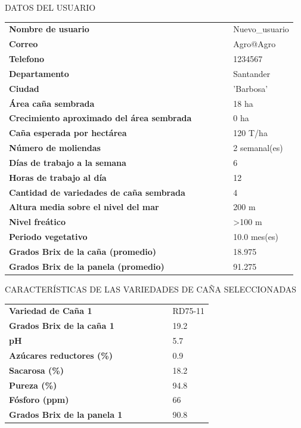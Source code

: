 \documentclass{article}%
\begin{document}
\newpage%
\begin{center}%
\begin{Huge}%
DATOS DEL USUARIO%
\end{Huge}%
\linebreak%
\end{center}%
\begin{tabular}{lccccl}%
\textbf{Nombre de usuario}& & & & &Nuevo\_usuario\\%
\textbf{Correo}& & & & &Agro@Agro\\%
\textbf{Telefono}& & & & &1234567\\%
\textbf{Departamento}& & & & &Santander\\%
\textbf{Ciudad}& & & & & 'Barbosa'\\%
\textbf{Área caña sembrada}& & & & &18 ha\\%
\textbf{Crecimiento aproximado del área sembrada}& & & & &0 ha\\%
\textbf{Caña esperada por hectárea}& & & & &120 T/ha\\%
\textbf{Número de moliendas}& & & & &2 semanal(es)\\%
\textbf{Días de trabajo a la semana}& & & & &6\\%
\textbf{Horas de trabajo al día}& & & & &12\\%
\textbf{Cantidad de variedades de caña sembrada}& & & & &4\\%
\textbf{Altura media sobre el nivel del mar}& & & & &200 m\\%
\textbf{Nivel freático}& & & & &>100 m\\%
\textbf{Periodo vegetativo}& & & & &10.0 mes(es)\\%
\textbf{Grados Brix de la caña (promedio)}& & & & &18.975\\%
\textbf{Grados Brix de la panela (promedio)}& & & & &91.275\\%
\end{tabular}%
\newpage%
\begin{center}%
\begin{Huge}%
CARACTERÍSTICAS DE LAS VARIEDADES DE CAÑA SELECCIONADAS%
\end{Huge}%
\linebreak%
\end{center}%
\begin{tabular}{lcccccl}%
\textbf{Variedad de Caña 1}& & & & & &RD75{-}11\\%
\textbf{Grados Brix de la caña 1}& & & & & &19.2\\%
\textbf{pH}& & & & & &5.7\\%
\textbf{Azúcares reductores (\%)}& & & & & &0.9\\%
\textbf{Sacarosa (\%)}& & & & & &18.2\\%
\textbf{Pureza (\%)}& & & & & &94.8\\%
\textbf{Fósforo (ppm)}& & & & & &66\\%
\textbf{Grados Brix de la panela 1}& & & & & &90.8\\%
\end{tabular}%
\end{document}
